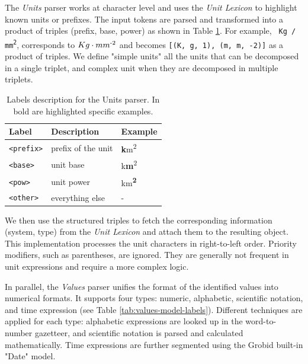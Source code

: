 The \textit{Units} parser works at character level and uses the \textit{Unit Lexicon} to highlight known units or prefixes. The input tokens are parsed and transformed into a product of triples (prefix, base, power) as shown in Table \ref{tab:units-model-labels}. For example, \texttt{ Kg / mm\textsuperscript{2}}, corresponds to \texttt{$Kg\cdot mm\textsuperscript{-2}$} and becomes \texttt{[(K, g, 1), (m, m, -2)]} as a product of triples. We define "simple units" all the units that can be decomposed in a single triplet, and complex unit when they are decomposed in multiple triplets. 

\begin{table}[htbp]
\centering
  \caption{Labels description for the Units parser. In bold are highlighted specific examples. }
  \label{tab:units-model-labels}
  \begin{tabular}{lll}
    \toprule
    Label & Description & Example\\
    \midrule
    \texttt{<prefix>} & prefix of the unit  & \textbf{k}m\textsuperscript{2} \\
    \texttt{<base>} & unit base & k\textbf{m}\textsuperscript{2}\\
    \texttt{<pow>} & unit power & km\textsuperscript{\textbf{2}}\\
    \texttt{<other>} & everything else & - \\
  \bottomrule
\end{tabular}
\end{table}

We then use the structured triples to fetch the corresponding information (system, type) from the \textit{Unit Lexicon} and attach them to the resulting object. 
This implementation processes the unit characters in right-to-left order. 
Priority modifiers, such as parentheses, are ignored. They are generally not frequent in unit expressions and require a more complex logic.

In parallel, the \textit{Values} parser unifies the format of the identified values into numerical formats. It supports four types: numeric, alphabetic, scientific notation, and time expression (see Table \ref{tab:values-model-labels}). Different techniques are applied for each type: alphabetic expressions are looked up in the word-to-number gazetteer, and scientific notation is parsed and calculated mathematically. Time expressions are further segmented using the Grobid built-in "Date" model.

